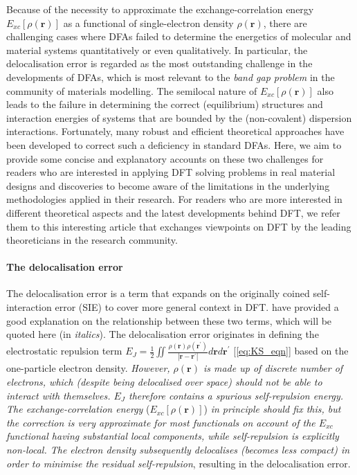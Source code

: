
Because of the necessity to approximate the exchange-correlation energy $E_{xc}[\rho(\bm{r})]$ as a functional of single-electron density $\rho(\bm{r})$,  there are challenging cases where DFAs failed to determine the energetics of molecular and material systems quantitatively or even qualitatively.\cite{cohen2012challenges} In particular, the delocalisation error is regarded as the most outstanding challenge in the developments of DFAs,\cite{bryenton2023delocalization} which is most relevant to the \textit{band gap problem}\cite{perdew1985density} in the community of materials modelling. The semilocal nature of $E_{xc}[\rho(\bm{r})]$ also leads to the failure in determining the correct (equilibrium) structures and interaction energies of systems that are bounded by the (non-covalent) dispersion interactions. Fortunately, many robust and  efficient theoretical approaches have been developed to correct such a deficiency in standard DFAs.\cite{grimme2016dispersion} Here, we aim to provide some concise and explanatory accounts on these two challenges for readers  who are  interested in applying DFT solving problems in real material designs and discoveries to become aware of the limitations in the underlying methodologies applied in their research. For readers who are more interested in   different theoretical aspects and the latest developments behind DFT, we refer them to this interesting article\cite{DFT_exchange} that exchanges  viewpoints on DFT by the leading theoreticians in the research community.

\paragraph{\textbf{The delocalisation error}} The delocalisation error is a term that expands\cite{perdew1982density,ruzsinszky2006spurious,mori2006many} on the originally coined self-interaction error (SIE)\cite{perdew1981self}  to cover more general context in DFT. \citet{hait2018delocalization} have provided a good explanation on the relationship between these two terms, which will be quoted here (in \emph{italics}). The delocalisation error originates in defining the electrostatic repulsion term $E_{J}=\frac{1}{2}\iint \frac{\rho(\bm{r})\rho(\bm{r}^\prime)}{\left\vert \bm{r}-\bm{r}^\prime\right\vert}d\bm{r}d\bm{r}^\prime$ [\cref{eq:KS_eqn}] based on the one-particle electron density. \emph{However, $\rho(\bm{r})$ is made up of discrete number of electrons, which (despite being delocalised over space) should not be able to interact with themselves. $E_J$ therefore contains a spurious self-repulsion energy. The exchange-correlation energy }($E_{xc}[\rho(\bm{r})]$) \emph{in principle should fix this, but the correction is very approximate for most functionals on account of the $E_{xc}$ functional having substantial local components, while self-repulsion is explicitly non-local. The electron density subsequently delocalises (becomes less compact) in order to minimise the residual self-repulsion}, resulting in the delocalisation error.

